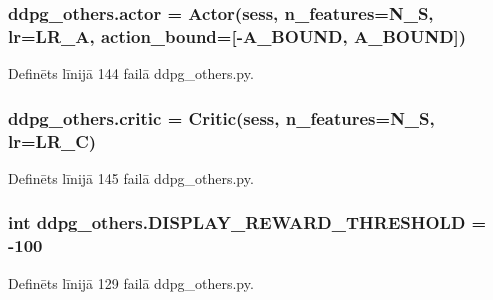 \subsubsection[{\texorpdfstring{actor}{actor}}]{\setlength{\rightskip}{0pt plus 5cm}ddpg\+\_\+others.\+actor = {\bf Actor}({\bf sess}, n\+\_\+features={\bf N\+\_\+S}, lr={\bf L\+R\+\_\+A}, action\+\_\+bound=\mbox{[}-\/{\bf A\+\_\+\+B\+O\+U\+ND}, {\bf A\+\_\+\+B\+O\+U\+ND}\mbox{]})}\hypertarget{namespaceddpg__others_ac9344417e957a7971f46d25644f70741}{}\label{namespaceddpg__others_ac9344417e957a7971f46d25644f70741}


Definēts līnijā 144 failā ddpg\+\_\+others.\+py.

\subsubsection[{\texorpdfstring{critic}{critic}}]{\setlength{\rightskip}{0pt plus 5cm}ddpg\+\_\+others.\+critic = {\bf Critic}({\bf sess}, n\+\_\+features={\bf N\+\_\+S}, lr={\bf L\+R\+\_\+C})}\hypertarget{namespaceddpg__others_a02a9cd4813c0b89d52754744bb297310}{}\label{namespaceddpg__others_a02a9cd4813c0b89d52754744bb297310}


Definēts līnijā 145 failā ddpg\+\_\+others.\+py.

\subsubsection[{\texorpdfstring{D\+I\+S\+P\+L\+A\+Y\+\_\+\+R\+E\+W\+A\+R\+D\+\_\+\+T\+H\+R\+E\+S\+H\+O\+LD}{DISPLAY_REWARD_THRESHOLD}}]{\setlength{\rightskip}{0pt plus 5cm}int ddpg\+\_\+others.\+D\+I\+S\+P\+L\+A\+Y\+\_\+\+R\+E\+W\+A\+R\+D\+\_\+\+T\+H\+R\+E\+S\+H\+O\+LD = -\/100}\hypertarget{namespaceddpg__others_abe31be53540bd026d448c7d8c7a10141}{}\label{namespaceddpg__others_abe31be53540bd026d448c7d8c7a10141}


Definēts līnijā 129 failā ddpg\+\_\+others.\+py.

